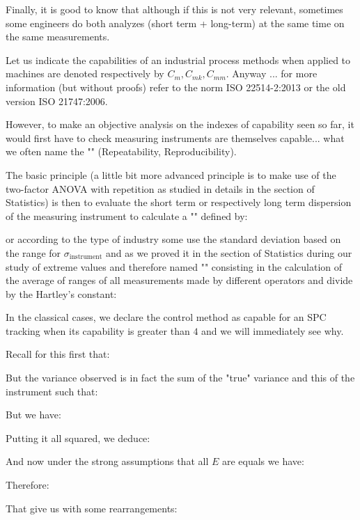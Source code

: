 	Finally, it is good to know that although if this is not very relevant, sometimes some engineers do both analyzes (short term + long-term) at the same time on the same measurements.
	
	\begin{tcolorbox}[title=Remark,colframe=black,arc=10pt]
	Let us indicate the capabilities of an industrial process methods when applied to machines are denoted respectively by $C_m,C_{mk},C_{mm}$. Anyway ... for more information (but without proofs) refer to the norm ISO 22514-2:2013 or the old version ISO 21747:2006.
	\end{tcolorbox}
	
	However, to make an objective analysis on the indexes of capability seen so far, it would first have to check measuring instruments are themselves capable... what we often name the "" (Repeatability, Reproducibility).
	
	The basic principle (a little bit more advanced principle is to make use of the two-factor ANOVA with repetition as studied in details in the section of Statistics) is then to evaluate the short term or respectively  long term dispersion of the measuring instrument to calculate a "" defined by:
	
	or according to the type of industry some use the standard deviation based on the range for $\sigma_{\text{instrument}}$ and as we proved it in the section of Statistics during our study of extreme values and therefore named "" consisting in the calculation of the average of ranges of all measurements made by different operators and divide by the Hartley's constant:
	
	In the classical cases, we declare the control method as capable for an SPC tracking when its capability is greater than $4$ and we will immediately see why. 
	
	Recall for this first that:
	
	But the variance observed is in fact the sum of the "true" variance and this of the instrument such that:
	
	But we have:
	
	Putting it all squared, we deduce:
	
	And now under the strong assumptions that all $E$ are equals we have:
	
	Therefore:
	
	That give us with some rearrangements:
	
